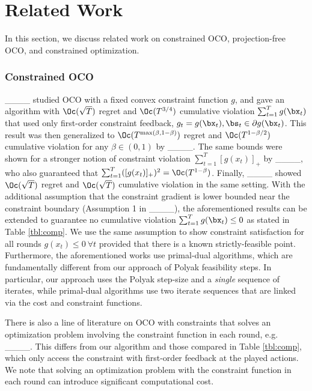\section{Related Work}
\label{sec:rel_work}

In this section, we discuss related work on constrained OCO, projection-free OCO, and constrained optimization.

\subsubsection{Constrained OCO}

____ studied OCO with a fixed convex constraint function $g$, and gave an algorithm with $\Oc(\sqrt{T})$ regret and $\Oc(T^{3/4})$ cumulative violation $\sum_{t=1}^T g(\bx_t)$ that used only first-order constraint feedback, $g_t = g(\bx_t), \bs_t \in \partial g(\bx_t)$.
This result was then generalized to $\Oc(T^{\max(\beta,1-\beta)})$ regret and $\Oc(T^{1 - \beta/2})$ cumulative violation for any $\beta \in (0,1)$ by ____.
The same bounds were shown for a stronger notion of constraint violation $\sum_{t=1}^T [g(x_t)]_+$ by ____, who also guaranteed that $\sum_{t=1}^T ([g(x_t)]_+)^2 = \Oc(T^{1 - \beta})$.
Finally, ____ showed $\Oc(\sqrt{T})$ regret and $\Oc(\sqrt{T})$ cumulative violation in the same setting.
With the additional assumption that the constraint gradient is lower bounded near the constraint boundary (Assumption 1 in ____), the aforementioned results can be extended to guarantee no cumulative violation $\sum_{t=1}^T g(\bx_t) \leq 0$ as stated in Table \ref{tbl:comp}.
We use the same assumption to show constraint satisfaction for all rounds $g(x_t) \leq 0\ \forall t$ provided that there is a known strictly-feasible point.
Furthermore, the aforementioned works use primal-dual algorithms, which are fundamentally different from our approach of Polyak feasibility steps.
In particular, our approach uses the Polyak step-size and a \emph{single} sequence of iterates, while primal-dual algorithms use two iterate sequences that are linked via the cost and constraint functions.

There is also a line of literature on OCO with constraints that solves an optimization problem involving the constraint function in each round, e.g. ____.
This differs from our algorithm and those compared in Table \ref{tbl:comp}, which only access the constraint with first-order feedback at the played actions.
We note that solving an optimization problem with the constraint function in each round can introduce significant computational cost.


